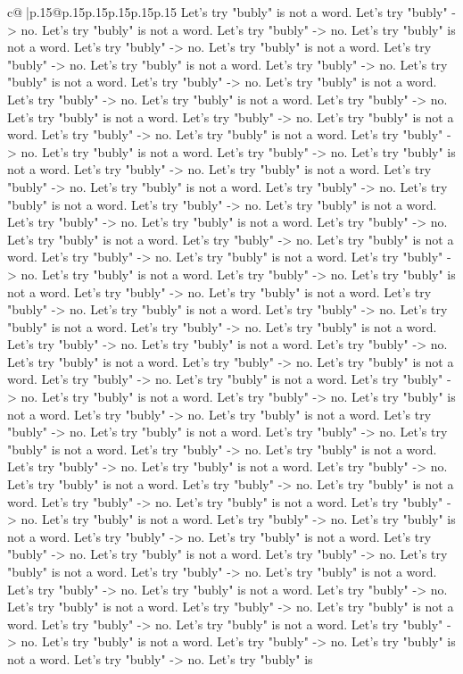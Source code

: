 \documentclass{article}
\begin{document}
{\begin{supertabular}{c@{$\;$}|p{.15\linewidth}@{}p{.15\linewidth}p{.15\linewidth}p{.15\linewidth}p{.15\linewidth}p{.15\linewidth}}
{{{Let's try "bubly" is not a word. Let's try "bubly" {-}> no. Let's try "bubly" is not a word. Let's try "bubly" {-}> no. Let's try "bubly" is not a word. Let's try "bubly" {-}> no. Let's try "bubly" is not a word. Let's try "bubly" {-}> no. Let's try "bubly" is not a word. Let's try "bubly" {-}> no. Let's try "bubly" is not a word. Let's try "bubly" {-}> no. Let's try "bubly" is not a word. Let's try "bubly" {-}> no. Let's try "bubly" is not a word. Let's try "bubly" {-}> no. Let's try "bubly" is not a word. Let's try "bubly" {-}> no. Let's try "bubly" is not a word. Let's try "bubly" {-}> no. Let's try "bubly" is not a word. Let's try "bubly" {-}> no. Let's try "bubly" is not a word. Let's try "bubly" {-}> no. Let's try "bubly" is not a word. Let's try "bubly" {-}> no. Let's try "bubly" is not a word. Let's try "bubly" {-}> no. Let's try "bubly" is not a word. Let's try "bubly" {-}> no. Let's try "bubly" is not a word. Let's try "bubly" {-}> no. Let's try "bubly" is not a word. Let's try "bubly" {-}> no. Let's try "bubly" is not a word. Let's try "bubly" {-}> no. Let's try "bubly" is not a word. Let's try "bubly" {-}> no. Let's try "bubly" is not a word. Let's try "bubly" {-}> no. Let's try "bubly" is not a word. Let's try "bubly" {-}> no. Let's try "bubly" is not a word. Let's try "bubly" {-}> no. Let's try "bubly" is not a word. Let's try "bubly" {-}> no. Let's try "bubly" is not a word. Let's try "bubly" {-}> no. Let's try "bubly" is not a word. Let's try "bubly" {-}> no. Let's try "bubly" is not a word. Let's try "bubly" {-}> no. Let's try "bubly" is not a word. Let's try "bubly" {-}> no. Let's try "bubly" is not a word. Let's try "bubly" {-}> no. Let's try "bubly" is not a word. Let's try "bubly" {-}> no. Let's try "bubly" is not a word. Let's try "bubly" {-}> no. Let's try "bubly" is not a word. Let's try "bubly" {-}> no. Let's try "bubly" is not a word. Let's try "bubly" {-}> no. Let's try "bubly" is not a word. Let's try "bubly" {-}> no. Let's try "bubly" is not a word. Let's try "bubly" {-}> no. Let's try "bubly" is not a word. Let's try "bubly" {-}> no. Let's try "bubly" is not a word. Let's try "bubly" {-}> no. Let's try "bubly" is not a word. Let's try "bubly" {-}> no. Let's try "bubly" is not a word. Let's try "bubly" {-}> no. Let's try "bubly" is not a word. Let's try "bubly" {-}> no. Let's try "bubly" is not a word. Let's try "bubly" {-}> no. Let's try "bubly" is not a word. Let's try "bubly" {-}> no. Let's try "bubly" is not a word. Let's try "bubly" {-}> no. Let's try "bubly" is not a word. Let's try "bubly" {-}> no. Let's try "bubly" is not a word. Let's try "bubly" {-}> no. Let's try "bubly" is not a word. Let's try "bubly" {-}> no. Let's try "bubly" is not a word. Let's try "bubly" {-}> no. Let's try "bubly" is not a word. Let's try "bubly" {-}> no. Let's try "bubly" is not a word. Let's try "bubly" {-}> no. Let's try "bubly" is not a word. Let's try "bubly" {-}> no. Let's try "bubly" is not a word. Let's try "bubly" {-}> no. Let's try "bubly" is not a word. Let's try "bubly" {-}> no. Let's try "bubly" is not a word. Let's try "bubly" {-}> no. Let's try "bubly" is not a word. Let's try "bubly" {-}> no. Let's try "bubly" is }}}
\end{supertabular}}
\end{document}
